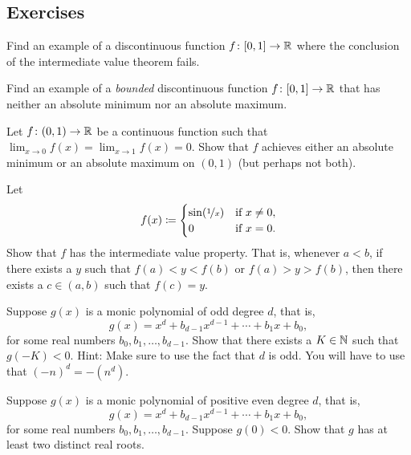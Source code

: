 \subsection{Exercises}

\begin{exercise}
Find an example of a discontinuous function $f \colon [0,1] \to {\mathbb{R}}$
where the conclusion of the intermediate value theorem fails.
\end{exercise}

\begin{exercise}
Find an example of a \emph{bounded} discontinuous function $f \colon [0,1]
\to {\mathbb{R}}$ that has neither an absolute minimum nor an absolute maximum.
\end{exercise}

\begin{exercise}
Let $f \colon (0,1) \to {\mathbb{R}}$ be a continuous function such that
$\displaystyle \lim_{x\to 0} f(x) =
\displaystyle \lim_{x\to 1} f(x) = 0$.  Show that
$f$ achieves either an absolute minimum or an absolute maximum on $(0,1)$
(but perhaps not both).
\end{exercise}

\begin{exercise} \label{exercise:meanvaluepropsin1x}
Let
\begin{equation*}
f(x) \coloneqq
\begin{cases}
\sin(\nicefrac{1}{x}) & \text{if } x \neq 0, \\
0 & \text{if } x=0.
\end{cases}
\end{equation*}
Show that $f$ has the intermediate value property.
That is, whenever $a < b$, if there exists a $y$ such that $f(a) < y < f(b)$
or $f(a) > y > f(b)$, then
there exists a $c \in (a,b)$ such that $f(c) = y$.
\end{exercise}

\begin{exercise} \label{exercise:odddegnegativeK}
Suppose $g(x)$ is a monic polynomial of odd degree $d$, that is,
\begin{equation*}
g(x) = x^d + b_{d-1} x^{d-1} + \cdots + b_1 x + b_0 ,
\end{equation*}
for some real numbers $b_{0}, b_1, \ldots, b_{d-1}$.  Show that there exists
a $K \in {\mathbb{N}}$ such that $g(-K) < 0$.  Hint: Make sure to use the fact that
$d$ is odd.  You will have to use that ${(-n)}^d = -(n^d)$.
\end{exercise}

\begin{exercise}
Suppose $g(x)$ is a monic polynomial of positive even degree $d$, that is,
\begin{equation*}
g(x) = x^d + b_{d-1} x^{d-1} + \cdots + b_1 x + b_0 ,
\end{equation*}
for some real numbers $b_{0}, b_1, \ldots, b_{d-1}$.  Suppose 
$g(0) < 0$.  Show that $g$ has at least two distinct real roots.
\end{exercise}

